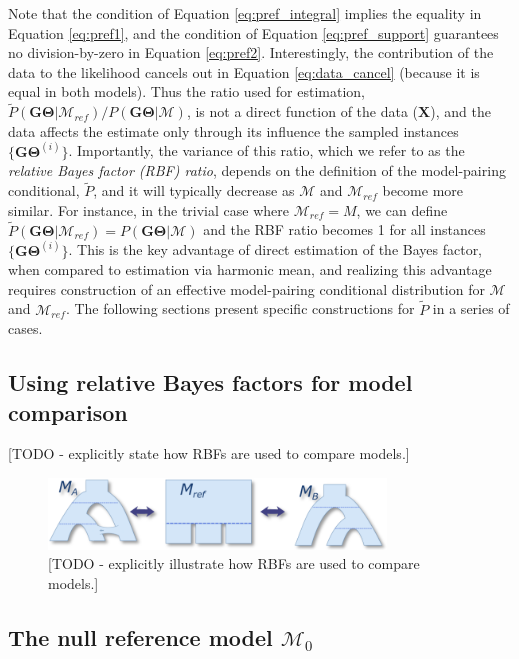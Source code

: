 \documentclass[11pt]{article}
\newcommand{\vect}[1]{\boldsymbol{\mathbf{#1}}}
\newcommand{\X}{\vect{X}}
\newcommand{\M}{\mathcal{M}}
\newcommand{\G}{\vect{G}}
\newcommand{\T}{\vect{\Theta}}
\newcommand{\GT}{\G\T}
\newcommand{\Mref}{\M_{ref}}
\newcommand{\Pref}{\widetilde{P}}
\newcommand{\1}{\mathbbm{1}}
\begin{document}
Note that the condition of Equation \ref{eq:pref_integral} implies the equality in Equation \ref{eq:pref1},
and the condition of Equation \ref{eq:pref_support} guarantees no division-by-zero in Equation \ref{eq:pref2}.
%
Interestingly, the contribution of the data to the likelihood cancels out in Equation \ref{eq:data_cancel} (because it is equal in both models).
%
Thus the ratio used for estimation, ${\Pref(\GT|\Mref) }/{P(\GT|\M)}$, is not a direct function of the data ($\X$),
and the data affects the estimate only through its influence the sampled instances $\{\GT^{(i)}\}$.
%
Importantly, the variance of this ratio, which we refer to as the {\em relative Bayes factor (RBF) ratio},
%
depends on the definition of the model-pairing conditional, $\Pref$, and it will
typically decrease as $\M$ and $\Mref$ become more similar.
For instance, in the trivial case where $\Mref=M$, we can define $\Pref(\GT|\Mref)=P(\GT|\M)$ and the RBF ratio becomes
1 for all instances $\{\GT^{(i)}\}$.
%
This is the key advantage of direct estimation of the Bayes factor, when compared to estimation via harmonic mean, and
realizing this advantage requires construction of an effective model-pairing conditional distribution for $\M$ and $\Mref$.
%
The following sections present specific constructions for $\Pref$ in a series of cases.


\subsection{Using relative Bayes factors for model comparison}

[TODO - explicitly state how RBFs are used to compare models.]

\begin{figure}[h]
\centering
\includegraphics[width=0.8\textwidth]
{A_vs_B_via_ref}
\captionsetup{width=.8\textwidth}
\caption{[TODO - explicitly illustrate how RBFs are used to compare models.]}
\label{fig:model_A__OR__model_b}
\end{figure}



\subsection{The null reference model $\M_0$}
\end{document}
